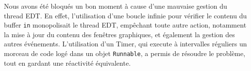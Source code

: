 \par Nous avons été bloqués un bon moment à cause d'une mauvaise gestion du thread EDT. En effet, l'utilisation d'une boucle infinie pour vérifier le contenu du buffer \texttt{in} monopolisait le thread EDT, empêchant toute autre action, notamment la mise à jour du contenu des fenêtres graphiques, et également la gestion des autres événements. L'utilisation d'un Timer, qui execute à intervalles réguliers un morceau de code logé dans un objet \texttt{Runnable}, a permis de résoudre le problème, tout en gardant une réactivité équivalente.

